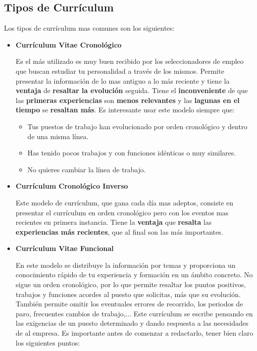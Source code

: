 \subsection{Tipos de Currículum}
Los tipos de currículum mas comunes son los siguientes:

\begin{itemize}
    \item \textbf{Currículum Vitae Cronológico}

    Es el más utilizado es muy buen recibido por los seleccionadores de empleo que buscan estudiar tu personalidad  a través de los mismos. Permite presentar la información de lo mas antiguo a lo más reciente y tiene la \textbf{ventaja} de \textbf{resaltar la evolución} seguida. Tiene el \textbf{inconveniente} de que las \textbf{primeras experiencias} son \textbf{menos relevantes} y las \textbf{lagunas en el tiempo} se \textbf{resaltan más}. Es interesante usar este modelo siempre que:

    \begin{itemize}
        \item Tus puestos de trabajo han evolucionado por orden cronológico y dentro de una misma línea.
        \item Has tenido pocos trabajos y con funciones idénticas o muy similares.
        \item No quieres cambiar la línea de trabajo.
    \end{itemize}

    \item \textbf{Currículum Cronológico Inverso}

    Este modelo de currículum, que gana cada día mas adeptos, consiste en presentar el currículum en orden cronológico pero con los eventos mas recientes en primera instancia. Tiene la \textbf{ventaja} que \textbf{resalta} las \textbf{experiencias más recientes}, que al final son las más importantes.

    \item \textbf{Currículum Vitae Funcional}

    En este modelo se distribuye la información por temas y proporciona un conocimiento rápido de tu experiencia y formación en un ámbito concreto. No sigue un orden cronológico, por lo que permite resaltar los puntos positivos, trabajos y funciones acordes al puesto que solicitas, más que su evolución. También permite omitir los eventuales errores de recorrido, los periodos de paro, frecuentes cambios de trabajo,... Este currículum se escribe pensando en las exigencias de un puesto determinado y dando respuesta a las necesidades de al empresa. Es importante antes de comenzar a redactarlo, tener bien claro los siguientes puntos:


\end{itemize}
